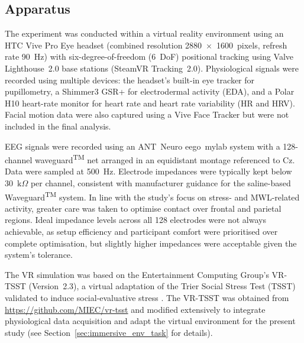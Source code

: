 \documentclass[lettersize,journal]{IEEEtran}
\begin{document}
\subsection{Apparatus}
The experiment was conducted within a virtual reality environment using an HTC Vive Pro Eye headset (combined resolution 2880~\(\times\)~1600~pixels, refresh rate 90~Hz) with six-degree-of-freedom (6~DoF) positional tracking using Valve Lighthouse~2.0 base stations (SteamVR Tracking~2.0). Physiological signals were recorded using multiple devices: the headset’s built-in eye tracker for pupillometry, a Shimmer3 GSR+ for electrodermal activity (EDA), and a Polar H10 heart-rate monitor for heart rate and heart rate variability (HR and HRV). Facial motion data were also captured using a Vive Face Tracker but were not included in the final analysis.  

EEG signals were recorded using an ANT~Neuro eego~mylab system with a 128-channel waveguard\textsuperscript{TM} net arranged in an equidistant montage referenced to Cz. Data were sampled at 500~Hz. Electrode impedances were typically kept below 30~\(\mathrm{k}\Omega\) per channel, consistent with manufacturer guidance for the saline-based Waveguard\textsuperscript{TM} system. In line with the study’s focus on stress- and MWL-related activity, greater care was taken to optimise contact over frontal and parietal regions. Ideal impedance levels across all 128 electrodes were not always achievable, as setup efficiency and participant comfort were prioritised over complete optimisation, but slightly higher impedances were acceptable given the system’s tolerance. 

The VR simulation was based on the Entertainment Computing Group’s VR-TSST (Version~2.3), a virtual adaptation of the Trier Social Stress Test (TSST) validated to induce social-evaluative stress \cite{liszioRelaxationDistractionFun2021}. The VR-TSST was obtained from \url{https://github.com/MIEC/vr-tsst} and modified extensively to integrate physiological data acquisition and adapt the virtual environment for the present study (see Section~\ref{sec:immersive_env_task} for details).
\end{document}
